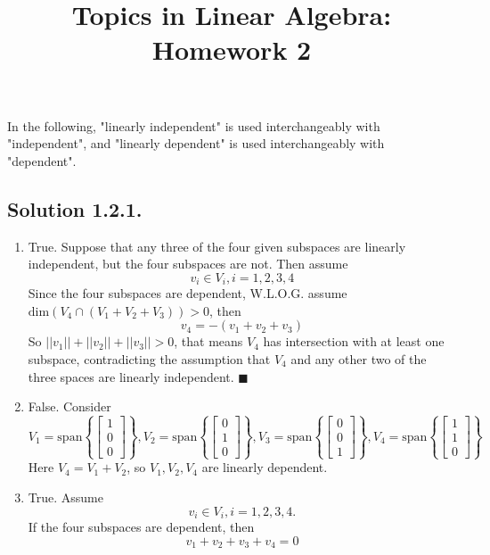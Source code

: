 \documentclass{article}
\title{Topics in Linear Algebra: Homework 2}
\begin{document}
\maketitle
In the following, "linearly independent" is used interchangeably with "independent", and "linearly dependent" is used interchangeably with "dependent".
\subsection*{Solution 1.2.1.}
\begin{enumerate}
    \item True. \newline 
    Suppose that any three of the four given subspaces are linearly independent, but the four subspaces are not. Then assume 
    \[v_i\in V_i, i = 1,2,3,4\]
    Since the four subspaces are dependent, W.L.O.G. assume $\mathrm{dim}(V_4\cap (V_1+V_2+V_3))>0$, then
    \[v_4=-(v_1+v_2+v_3)\]
    So $||v_1||+||v_2||+||v_3||>0$, that means $V_4$ has intersection with at least one subspace, contradicting the assumption that $V_4$ and any other two of the three spaces are linearly independent. $\blacksquare$
    \item False. \newline
    Consider 
    \[
    V_1=\mathrm{span}\left\{\left[\begin{array}{r} 1\\0\\0
    \end{array}\right]\right\}, 
    V_2=\mathrm{span}\left\{\left[\begin{array}{r} 0\\1\\0
    \end{array}\right]\right\}, 
    V_3=\mathrm{span}\left\{\left[\begin{array}{r} 0\\0\\1
    \end{array}\right]\right\}, 
    V_4=\mathrm{span}\left\{\left[\begin{array}{r} 1\\1\\0
    \end{array}\right]\right\}
    \]
    Here $V_4=V_1+V_2$, so $V_1, V_2, V_4$ are linearly dependent.
    \item True. \newline
     Assume 
    \[v_i\in V_i, i = 1,2,3,4.\]
    If the four subspaces are dependent, then 
    \[v_1+v_2+v_3+v_4=0\]

\end{enumerate}
\end{document}
